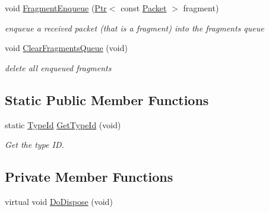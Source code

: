 \begin{DoxyCompactItemize}
void \hyperlink{classns3_1_1WimaxConnection_ae7d985915012a837359aa62413457045}{Fragment\+Enqueue} (\hyperlink{classns3_1_1Ptr}{Ptr}$<$ const \hyperlink{classns3_1_1Packet}{Packet} $>$ fragment)
\begin{DoxyCompactList}\small\item\em enqueue a received packet (that is a fragment) into the fragments queue \end{DoxyCompactList}\item 
void \hyperlink{classns3_1_1WimaxConnection_a819008b698dd34be127c294c2ec1a198}{Clear\+Fragments\+Queue} (void)
\begin{DoxyCompactList}\small\item\em delete all enqueued fragments \end{DoxyCompactList}\end{DoxyCompactItemize}
\subsection*{Static Public Member Functions}
\begin{DoxyCompactItemize}
\item 
static \hyperlink{classns3_1_1TypeId}{Type\+Id} \hyperlink{classns3_1_1WimaxConnection_adcb95addb6a2ff6e1a45b4ebe4b24510}{Get\+Type\+Id} (void)
\begin{DoxyCompactList}\small\item\em Get the type ID. \end{DoxyCompactList}\end{DoxyCompactItemize}
\subsection*{Private Member Functions}
\begin{DoxyCompactItemize}
\item 
virtual void \hyperlink{classns3_1_1WimaxConnection_a0ed4866f095ff739f9abf4093c6d36f5}{Do\+Dispose} (void)
\end{DoxyCompactItemize}
